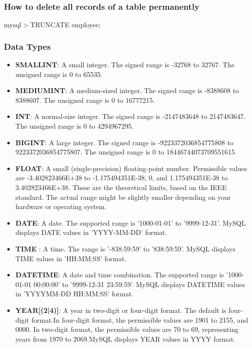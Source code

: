\documentclass[11pt,a4paper]{article}
\begin{document}
\subsubsection*{How to delete all records of a table permanently}
mysql$>$TRUNCATE employee;
\subsubsection*{Data Types}
\begin{itemize}
\item{\textbf{SMALLINT}: A small integer. The signed range is -32768 to 32767. The unsigned range
is 0 to 65535.}

\item{\textbf{MEDIUMINT}}: A medium-sized integer. The signed range is -8388608 to 8388607. The unsigned range is 0 to 16777215.

\item{\textbf{INT}}: A normal-size integer. The signed range is -2147483648 to 2147483647. The unsigned range is 0 to 4294967295.

\item{\textbf{BIGINT}}: A large integer. The signed range is -9223372036854775808 to 9223372036854775807. The unsigned range is 0 to 18446744073709551615.

\item{\textbf{FLOAT}}: A small (single-precision) floating-point number. Permissible values are -3.402823466E+38 to -1.175494351E-38, 0, and 1.175494351E-38 to 3.402823466E+38. These are the theoretical limits, based on the IEEE standard. The actual range might be slightly smaller depending on your hardware or operating system.

\item{\textbf{DATE}}: A date. The supported range is '1000-01-01' to '9999-12-31'. MySQL displays DATE values in 'YYYY-MM-DD' format.

\item{\textbf{TIME}} : A time. The range is '-838:59:59' to '838:59:59'. MySQL displays TIME values in 'HH:MM:SS' format.

\item{\textbf{DATETIME}}: A date and time combination. The supported range is '1000-01-01 00:00:00' to '9999-12-31 23:59:59'. MySQL displays DATETIME values in 'YYYYMM-DD HH:MM:SS' format.

\item{\textbf{YEAR[(2|4)]}}: A year in two-digit or four-digit format. The default is four-digit format.In four-digit format, the permissible values are 1901 to 2155, and 0000. In two-digit format, the permissible values are 70 to 69, representing years from 1970 to 2069.MySQL displays YEAR values in YYYY format.


\end{itemize}
\end{document}
